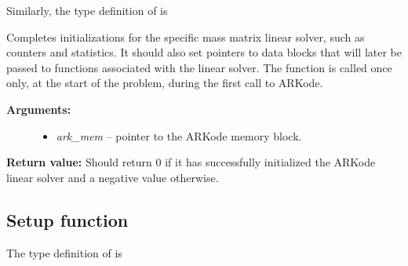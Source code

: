 \documentclass[letterpaper,10pt,english]{sphinxmanual}
\begin{document}
Similarly, the type definition of {\hyperref[linear_solvers/custom:c.minit]{\emph{}}} is

\begin{fulllineitems}
\label{linear_solvers/custom:c.minit}
Completes initializations for the specific mass matrix linear
solver, such as counters and statistics.  It should also set
pointers to data blocks that will later be passed to functions
associated with the linear solver.  The {\hyperref[linear_solvers/custom:c.minit]{\emph{}}} function
is called once only, at the start of the problem, during the first
call to ARKode.
\begin{description}
\item[{\textbf{Arguments:}}] \leavevmode\begin{itemize}
\item {} 
\emph{ark\_mem} -- pointer to the ARKode memory block.

\end{itemize}

\end{description}

\textbf{Return value:}  Should return 0 if it has successfully
initialized the ARKode linear solver and a negative value
otherwise.

\end{fulllineitems}



\subsection{Setup function}
\label{linear_solvers/custom:setup-function}
The type definition of {\hyperref[linear_solvers/custom:c.lsetup]{\emph{}}} is
\end{document}
